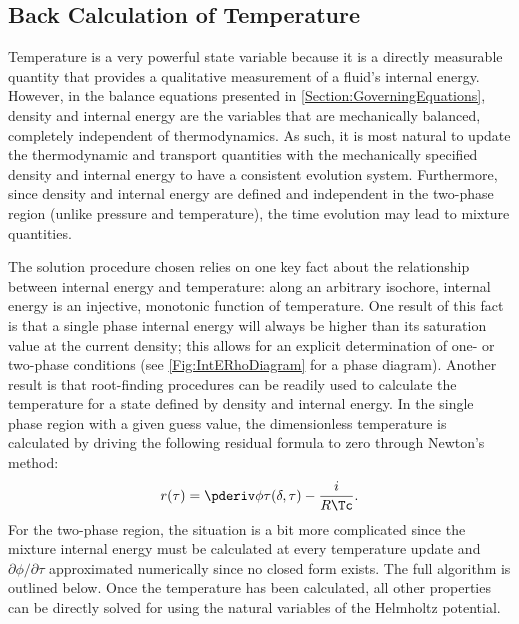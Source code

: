 \subsection{Back Calculation of Temperature}
Temperature is a very powerful state variable because it is a directly measurable quantity that provides a qualitative measurement of a fluid's internal energy.
However, in the balance equations presented in \cref{Section:GoverningEquations}, density and internal energy are the variables that are mechanically balanced, completely independent of thermodynamics. 
As such, it is most natural to update the thermodynamic and transport quantities with the mechanically specified density and internal energy to have a consistent evolution system.
Furthermore, since density and internal energy are defined and independent in the two-phase region (unlike pressure and temperature), the time evolution may lead to mixture quantities.

The solution procedure chosen relies on one key fact about the relationship between internal energy and temperature: 
along an arbitrary isochore, internal energy is an injective, monotonic function of temperature.
One result of this fact is that a single phase internal energy will always be higher than its saturation value at the current density; this allows for an explicit determination of one- or two-phase conditions (see \cref{Fig:IntERhoDiagram} for a phase diagram).
Another result is that root-finding procedures can be readily used to calculate the temperature for a state defined by density and internal energy.
In the single phase region with a given guess value, the dimensionless temperature is calculated by driving the following residual formula to zero through Newton's method:
\begin{equation}
    r(\tau) = \phit(\delta,\tau) - \frac{i}{R\Tc}.
    \label{Eqn:SinglePhaseResidualForTemperature}
\end{equation}
For the two-phase region, the situation is a bit more complicated since the mixture internal energy must be calculated at every temperature update and $\partial\phi/\partial\tau$ approximated numerically since no closed form exists.
The full algorithm is outlined below.
Once the temperature has been calculated, all other properties can be directly solved for using the natural variables of the Helmholtz potential.

